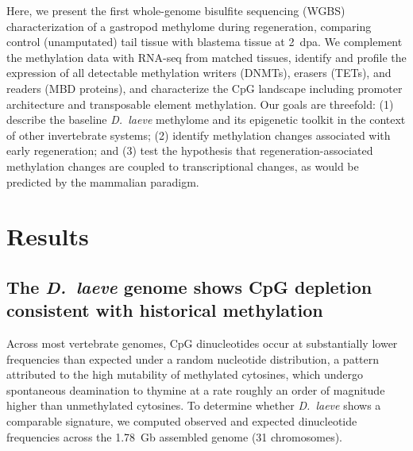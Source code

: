 \documentclass[12pt]{article}
\begin{document}
Here, we present the first whole-genome bisulfite sequencing (WGBS) characterization of a gastropod methylome during regeneration, comparing control (unamputated) tail tissue with blastema tissue at 2~dpa. We complement the methylation data with RNA-seq from matched tissues, identify and profile the expression of all detectable methylation writers (DNMTs), erasers (TETs), and readers (MBD proteins), and characterize the CpG landscape including promoter architecture and transposable element methylation. Our goals are threefold: (1) describe the baseline \textit{D.\ laeve} methylome and its epigenetic toolkit in the context of other invertebrate systems; (2) identify methylation changes associated with early regeneration; and (3) test the hypothesis that regeneration-associated methylation changes are coupled to transcriptional changes, as would be predicted by the mammalian paradigm.



\section*{Results}


\subsection*{The \textit{D.\ laeve} genome shows CpG depletion consistent with historical methylation}

Across most vertebrate genomes, CpG dinucleotides occur at substantially lower frequencies than expected under a random nucleotide distribution, a pattern attributed to the high mutability of methylated cytosines, which undergo spontaneous deamination to thymine at a rate roughly an order of magnitude higher than unmethylated cytosines. To determine whether \textit{D.\ laeve} shows a comparable signature, we computed observed and expected dinucleotide frequencies across the 1.78~Gb assembled genome (31 chromosomes).
\end{document}
